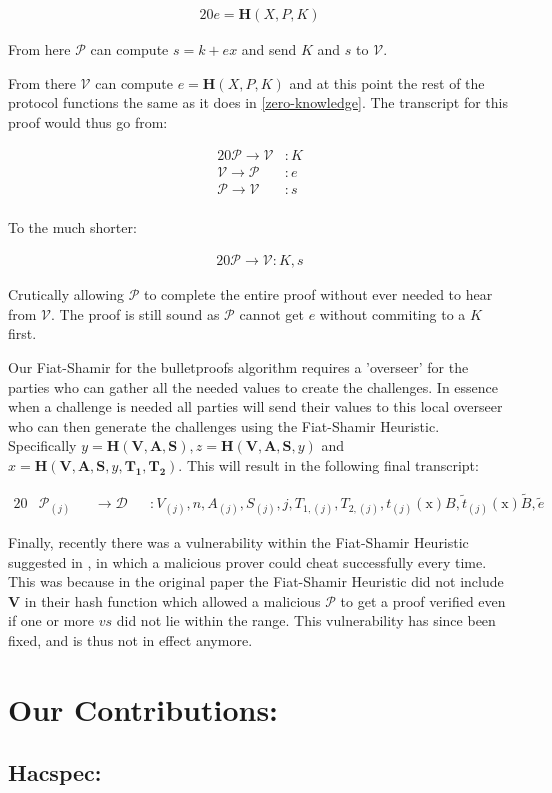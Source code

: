 \documentclass{article}
\newcommand{\eq}[1]{\begin{alignat*}{20}#1\end{alignat*}}
\renewcommand{\vec}[1]{\boldsymbol{#1}}
\newcommand{\ran}[1]{\mathrm{#1}}
\newcommand{\V}{\mathcal{V}}
\renewcommand{\P}{\mathcal{P}}
\newcommand{\D}{\mathcal{D}}
\newcommand{\tB}{\widetilde{B}}
\renewcommand{\tt}{\widetilde{t}}
\begin{document}
\eq{
	e = \textbf{H}(X,P,K)
}

From here $\P$ can compute $s = k + ex$ and send $K$ and $s$ to $\V$. 

From there $\V$ can compute $e = \textbf{H}(X,P,K)$ and at this point the rest of the protocol functions the same as it does in \ref{zero-knowledge}. The transcript for this proof would thus go from:

\eq{
	\P \rightarrow \V &: K \\
	\V \rightarrow \P &: e \\
	\P \rightarrow \V &: s \\
}

To the much shorter:

\eq{
	\P \rightarrow \V: K, s
}

Crutically allowing $\P$ to complete the entire proof without ever
needed to hear from $\V$. The proof is still sound as $\P$ cannot get
$e$ without commiting to a $K$ first.

Our Fiat-Shamir for the bulletproofs algorithm requires a 'overseer' for the parties who can gather all the needed values to create the challenges. In essence when a challenge is needed all parties will send their values to this local overseer who can then generate the challenges using the Fiat-Shamir Heuristic. Specifically $y = \textbf{H}(\vec{V},\vec{A},\vec{S}), z = \textbf{H}(\vec{V},\vec{A},\vec{S}, y)$ and $x = \textbf{H}(\vec{V},\vec{A},\vec{S}, y, \vec{T_1},\vec{T_2})$. This will result in the following final transcript:

\eq{
	&\P_{(j)} &&\rightarrow \D &&: V_{(j)}, n, A_{(j)}, S_{(j)}, j, T_{1, (j)}, T_{2,(j)}, t_{(j)}(\ran{x})B, \tt_{(j)}(\ran{x})\tB, \widetilde{e}
}

Finally, recently there was a vulnerability within the Fiat-Shamir Heuristic suggested in \cite{bulletproofs}, in which a malicious prover could cheat successfully every time. This was because in the original paper the Fiat-Shamir Heuristic did not include $\vec{V}$ in their hash function which allowed a malicious $\P$ to get a proof verified even if one or more $vs$ did not lie within the range. This vulnerability has since been fixed, and is thus not in effect anymore.

\section{Our Contributions:}

\subsection{Hacspec:} \label{Hacspec}
\end{document}

